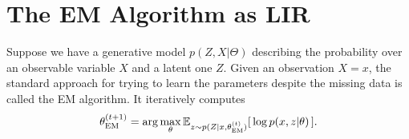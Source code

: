 
\section{The EM Algorithm as LIR}
Suppose we have a generative model $p(Z,X | \Theta)$
describing the probability over an observable variable $X$ and a latent one $Z$.
%
Given an observation $X{=}x$,
the standard approach for trying to learn the parameters despite
the missing data is called the EM algorithm. It iteratively computes
\[
    \theta^{(t+1)}_{\text{EM}}
            = \arg\max_{\theta} \operatorname*{\mathbb{E}}\nolimits_{z\sim p(Z|x,\theta_{\text{EM}}^{(t)})}[ \,\log p(x, z | \theta) \,].
\]

